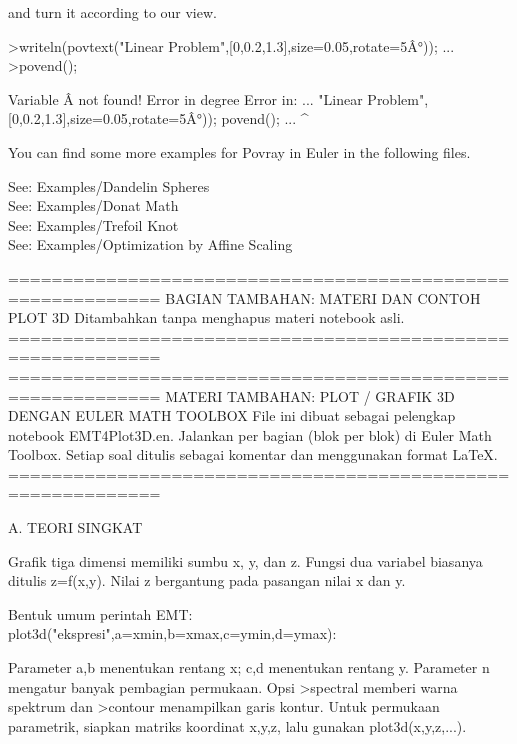 \documentclass[a4paper,10pt]{article}
\begin{document}
\begin{eulernotebook}
\begin{eulercomment}
and turn it according to our view.
\end{eulercomment}
\begin{eulerprompt}
>writeln(povtext("Linear Problem",[0,0.2,1.3],size=0.05,rotate=5Â°)); ...
>povend();
\end{eulerprompt}
\begin{euleroutput}
  Variable Â not found!
  Error in degree
  Error in:
  ... "Linear Problem",[0,0.2,1.3],size=0.05,rotate=5Â°)); povend(); ...
                                                       ^
\end{euleroutput}
\begin{eulercomment}
You can find some more examples for Povray in Euler in the following
files.

See: Examples/Dandelin Spheres\\
See: Examples/Donat Math\\
See: Examples/Trefoil Knot\\
See: Examples/Optimization by Affine Scaling
\end{eulercomment}
\begin{eulercomment}
============================================================
BAGIAN TAMBAHAN: MATERI DAN CONTOH PLOT 3D
Ditambahkan tanpa menghapus materi notebook asli.
============================================================
============================================================
MATERI TAMBAHAN: PLOT / GRAFIK 3D DENGAN EULER MATH TOOLBOX
File ini dibuat sebagai pelengkap notebook EMT4Plot3D.en.
Jalankan per bagian (blok per blok) di Euler Math Toolbox.
Setiap soal ditulis sebagai komentar dan menggunakan format LaTeX.
============================================================
\end{eulercomment}
\eulersubheading{}
\begin{eulercomment}
A. TEORI SINGKAT
\end{eulercomment}
\eulersubheading{}
\begin{eulercomment}
Grafik tiga dimensi memiliki sumbu x, y, dan z. Fungsi dua
variabel biasanya ditulis z=f(x,y). Nilai z bergantung pada
pasangan nilai x dan y.

Bentuk umum perintah EMT:
plot3d("ekspresi",a=xmin,b=xmax,c=ymin,d=ymax):

Parameter a,b menentukan rentang x; c,d menentukan rentang y.
Parameter n mengatur banyak pembagian permukaan. Opsi \textgreater{}spectral
memberi warna spektrum dan \textgreater{}contour menampilkan garis kontur.
Untuk permukaan parametrik, siapkan matriks koordinat x,y,z,
lalu gunakan plot3d(x,y,z,...).


\end{eulercomment}
\end{eulernotebook}
\end{document}

